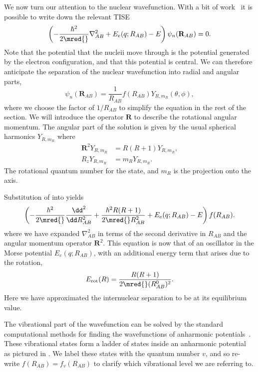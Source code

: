We now turn our attention to the nuclear wavefunction. With a bit of
work~\cite{brown_carrington_2003} it is possible to write down the relevant
TISE
%
\begin{equation}
  \left(-\frac{\hbar^2}{2\mred{}}\nabla_{AB}^2 + E_e(q; R_{AB}) -
  E\right)\psi_n(\mathbf{R}_{AB}) = 0.
  \label{theory:eqn:nucTISE}
\end{equation}
%
Note that the potential that the nucleii move through is the potential
generated by the electron configuration, and that this potential is central. We
can therefore anticipate the separation of the nuclear wavefunction into radial
and angular parts,
%
\begin{equation}
  \psi_n(\mathbf{R}_{AB}) = \frac{1}{R_{AB}}f(R_{AB})Y_{R, m_R}(\theta, \phi),
  \label{theory:eqn:nucsep}
\end{equation}
%
where we choose the factor of $1/R_{AB}$ to simplify the equation in the rest
of the section. We will introduce the operator $\mathbf{R}$ to describe the
rotational angular momentum. The angular part of the solution is given by the usual
spherical harmonics $Y_{R, m_R}$ where
%
\begin{align}
  \mathbf{R}^2 Y_{R, m_R} &= R(R+1) Y_{R, m_R}, \\
  R_z Y_{R, m_R} &= m_R Y_{R, m_R}.
\end{align}
%
The rotational quantum number for the state, and $m_R$ is the projection onto
the axis.

Substitution of  into 
yields 
%
\begin{equation}
  \left(-\frac{\hbar^2}{2\mred{}}\frac{\dd^2}{\dd R_{AB}^2} +
    \frac{\hbar^2 R(R+1)}{2\mred{}R_{AB}^2} + E_e(q; R_{AB}) - E\right)f(R_{AB}).
\end{equation}
%
where we have expanded $\nabla_{AB}^2$ in terms of the second derivative in
$R_{AB}$ and the angular momentum operator $\mathbf{R}^2$. This equation is now
that of an oscillator in the Morse potential $E_e(q; R_{AB})$, with an
additional energy term that arises due to the rotation,
%
\begin{equation}
  E_\text{rot}(R) = \frac{R(R+1)}{2\mred{} (R_{AB}^0)^2}.
  \label{theory:eqn:rotenergy}
\end{equation}
%
Here we have approximated the internuclear separation to be at its equilibrium
value.

The vibrational part of the wavefunction can be solved by the standard
computational methods for finding the wavefunctions of anharmonic
potentials~\cite{Foot2005}. These vibrational states form a ladder of
states inside an anharmonic potential~\cite{Binney} as pictured in
. We label these states with the quantum number
$v$, and so re-write $f(R_{AB}) = f_v(R_{AB})$ to clarify which vibrational
level we are referring to.

